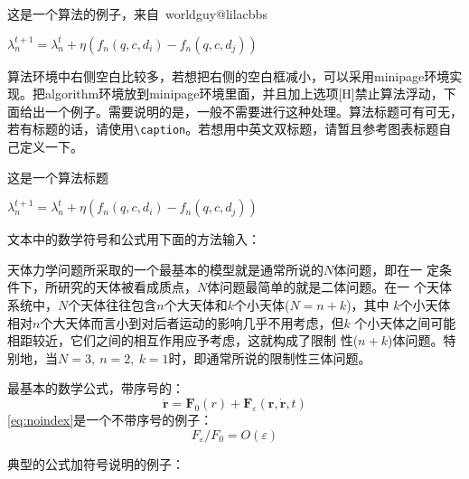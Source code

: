这是一个算法的例子，来自~worldguy@lilacbbs~
\begin{algorithm}

{   
    $\lambda^{t+1}_n = \lambda^t_n + \eta (f_n(q, c, d_i) - f_n(q, c, d_j))$
 }
\end{algorithm}
算法环境中右侧空白比较多，若想把右侧的空白框减小，可以采用minipage环境实现。把algorithm环境放到minipage环境里面，并且加上选项[H]禁止算法浮动，下面给出一个例子。需要说明的是，一般不需要进行这种处理。算法标题可有可无，若有标题的话，请使用\verb|\caption|。若想用中英文双标题，请暂且参考图表标题自己定义一下。

\begin{minipage}{0.8\textwidth}
\vspace{5mm}
\begin{algorithm}[H]
\caption{这是一个算法标题}

{   
    $\lambda^{t+1}_n = \lambda^t_n + \eta (f_n(q, c, d_i) - f_n(q, c, d_j))$
 }
\end{algorithm}
\end{minipage}


\label{Tricks:Equations}

文本中的数学符号和公式用下面的方法输入：

天体力学问题所采取的一个最基本的模型就是通常所说的$N$体问题，即在一
定条件下，所研究的天体被看成质点，$N$体问题最简单的就是二体问题。在一
个天体系统中，$N$个天体往往包含$n$个大天体和$k$个小天体($N=n+k$)，其中
$k$个小天体相对$n$个大天体而言小到对后者运动的影响几乎不用考虑，但$k$
个小天体之间可能相距较近，它们之间的相互作用应予考虑，这就构成了限制
性($n+k$)体问题。特别地，当$N=3,~n=2,~k=1$时，即通常所说的限制性三体问题。


最基本的数学公式，带序号的：
\begin{equation}
\ddot{\mathbf{r}}=\mathbf{F}_{0}(r)+\mathbf{F}_{\varepsilon}(\mathbf{r},\dot{\mathbf{r}},t)
\end{equation}
\eqref{eq:noindex}是一个不带序号的例子：
\begin{displaymath}\label{eq:noindex}
F_{\varepsilon}/F_{0}=O (\varepsilon)
\end{displaymath}

\FloatBarrier %
典型的公式加符号说明的例子：

